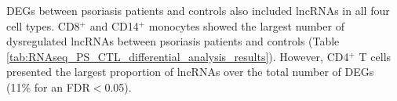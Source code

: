 DEGs between psoriasis patients and controls also included lncRNAs in all four cell types. CD8$^+$ and CD14$^+$ monocytes showed the largest number of dysregulated lncRNAs between psoriasis patients and controls (Table \ref{tab:RNAseq_PS_CTL_differential_analysis_results}). However, CD4$^+$ T cells presented the largest proportion of lncRNAs over the total number of DEGs (11\% for an FDR$<$0.05).

%

